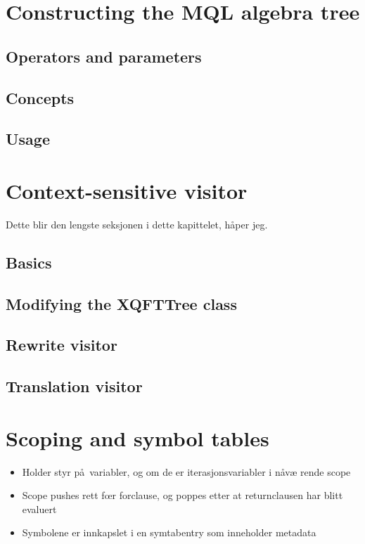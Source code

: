 \section{Constructing the MQL algebra tree}
\subsection{Operators and parameters}
\subsection{Concepts}
\subsection{Usage}

\section{Context-sensitive visitor}
Dette blir den lengste seksjonen i dette kapittelet, h\aa per jeg.
\subsection{Basics}
\subsection{Modifying the XQFTTree class}
\subsection{Rewrite visitor}
\subsection{Translation visitor}

\section{Scoping and symbol tables}
\begin{itemize}
  \item Holder styr p\aa~variabler, og om de er iterasjonsvariabler i n\aa v\ae
  rende scope
  \item Scope pushes rett f\oe r forclause, og poppes etter at returnclausen har
  blitt evaluert
  \item Symbolene er innkapslet i en symtabentry som inneholder metadata
\end{itemize}

